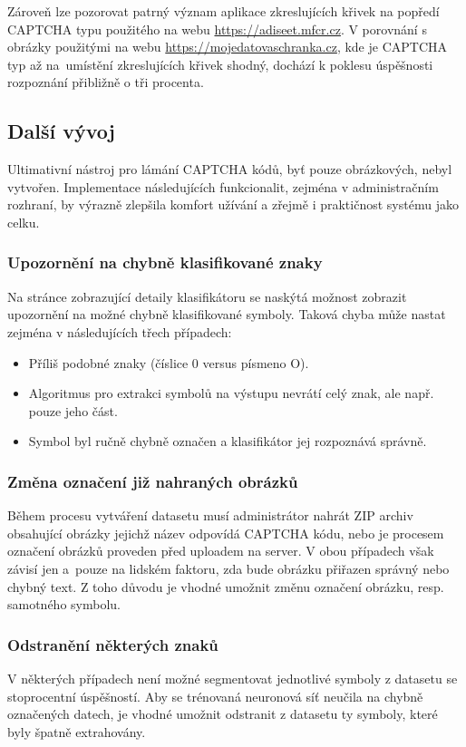 \documentclass[
  field=ainfp,
  master=true,
  biblatex,
  sourcecodes=false,
  theorems=false,
  glossaries,
  index
]{kidiplom}
\begin{document}
Zároveň lze pozorovat patrný význam aplikace zkreslujících křivek na popředí CAPT\-CHA typu použitého na webu \url{https://adiseet.mfcr.cz}. V porov\-nání s ob\-rázky použitými na webu \url{https://mojedatovaschranka.cz}, kde je CAPTCHA typ až na~umístění zkreslujících křivek shodný, dochází k poklesu úspěšnosti rozpoznání přibližně o  tři procenta.

\subsection{Další vývoj}
Ultimativní nástroj pro lámání CAPTCHA kódů, byť pouze obrázkových, nebyl vytvořen. Implementace následujících funkcionalit, zejména v administračním rozhraní, by výrazně zlepšila komfort užívání a zřejmě i praktičnost systému jako celku.

\subsubsection*{Upozornění na chybně klasifikované znaky} 
Na stránce zobrazující detaily klasifikátoru se naskýtá možnost zobrazit upozornění na možné chybně klasifikované symboly. Taková chyba může nastat zejména v následujících třech případech: 
\begin{itemize}
\item Příliš podobné znaky (číslice 0 versus písmeno O).
\item Algoritmus pro extrakci symbolů na výstupu nevrátí celý znak, ale např. pouze jeho část.
\item Symbol byl ručně chybně označen a klasifikátor jej rozpoznává správně.
\end{itemize}

\subsubsection*{Změna označení již nahraných obrázků} 
Během procesu vytváření datasetu musí administrátor nahrát ZIP archiv obsahující obrázky jejichž název odpovídá CAPTCHA kódu, nebo je procesem označení obrázků proveden před uploadem na server. V obou případech však závisí jen a~pouze na lidském faktoru, zda bude obrázku přiřazen správný nebo chybný text. Z toho důvodu je vhodné umožnit změnu označení obrázku, resp. samotného symbolu.

\subsubsection*{Odstranění některých znaků}
V některých případech není možné segmentovat jednotlivé symboly z datasetu se stoprocentní úspěšností. Aby se trénovaná neuronová síť neučila na chybně označených datech, je vhodné umožnit odstranit z datasetu ty symboly, které byly špatně extrahovány.
\end{document}
